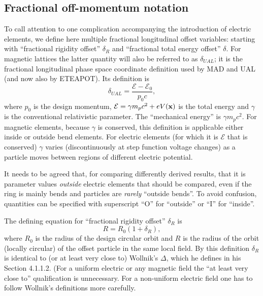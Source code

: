 \documentclass[12]{article}
\begin{document}
\subsection{Fractional off-momentum notation\label{sec:FracLongitOffset}}
To call attention to one complication accompanying the introduction of
electric elements, we define here multiple fractional longitudinal offset 
variables: starting with ``fractional rigidity offset'' $\delta_R$ 
and ``fractional total energy offset'' $\delta$.  For magnetic lattices 
the latter quantity will also be referred to as $\delta_{UAL}$; it is the 
fractional longitudinal phase space coordinate definition used by MAD and UAL 
(and now also by ETEAPOT). Its definition is
%
\begin{equation}
\delta_{UAL} = \frac{\mathcal{E}-\mathcal{E}_0}{p_0c},
\label{eq:Notation.1}
\end{equation}
%
where $p_0$ is the design momentum, 
$\mathcal{E}=\gamma m_pc^2 + eV({\bf x})$ is the total energy
and $\gamma$ is the conventional relativistic parameter. 
The ``mechanical energy'' is $\gamma m_pc^2$. For magnetic elements, because
$\gamma$ is conserved, this definition is applicable either 
inside or outside bend elements. For electric elements (for
which it is $\mathcal{E}$ that is conserved)
$\gamma$ varies (discontinuously at step function voltage changes)
as a particle moves between regions of different electric potential.

It needs to be agreed that, for comparing differently derived 
results, that it is parameter values \emph{outside} electric
elements that should be compared, even if the ring is mainly bends
and particles are \emph{rarely}
``outside bends''. To avoid confusion, quantities can
be specified with superscript ``O'' for ``outside''
or ``I'' for ``inside''.

The defining equation for ``fractional rigidity offset'' $\delta_R$ is
%
\begin{equation}
R = R_0(1+\delta_R),
\label{eq:Notation.2}
\end{equation}
%
where $R_0$ is the radius of the design circular orbit
and $R$ is the radius of the orbit (locally circular) of
the offset particle in the same local field. By this definition
$\delta_R$ is identical to (or at least very close to) 
Wollnik's\cite{Wollnik} $\Delta$, which he defines in his 
Section 4.1.1.2. (For a uniform electric or any magnetic field 
the ``at least very close to''
qualification is unnecessary. For a non-uniform electric field
one has to follow Wollnik's definitions more carefully.
\end{document}
